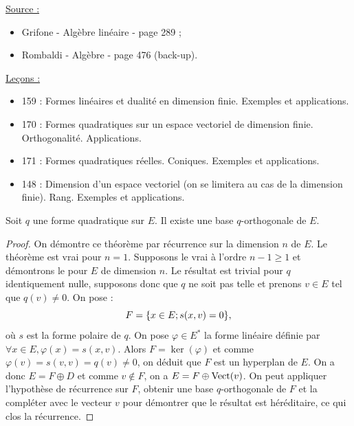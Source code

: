 
\newcommand{\Ee}{E^{\ast}}
\newcommand{\zero}{\set{0}}

\pagestyle{fancy}

\fancyhead[C]{}
\fancyhead[R]{}



\underline{Source :} 
\begin{itemize}
\item Grifone - Algèbre linéaire - page 289 ;
\item Rombaldi - Algèbre - page 476 (back-up).
\end{itemize}

\underline{Leçons :}
\begin{itemize}
\item  159 : Formes linéaires et dualité en dimension finie. Exemples et applications.
\item  170 : Formes quadratiques sur un espace vectoriel de dimension finie. Orthogonalité. Applications.
\item  171 : Formes quadratiques réelles. Coniques. Exemples et applications.
\item  148 : Dimension d’un espace vectoriel (on se limitera au cas de la dimension finie). Rang. Exemples et applications.
\end{itemize}

\begin{thm}
Soit $q$ une forme quadratique sur $E$. Il existe une base $q$-orthogonale de $E$.
\end{thm}

\begin{proof}
On démontre ce théorème par récurrence sur la dimension $n$ de $E$.
Le théorème est vrai pour $n=1$. Supposons le vrai à l'ordre $n-1 \geq 1$ et démontrons le pour $E$ de dimension $n$.
Le résultat est trivial pour $q$ identiquement nulle, supposons donc que $q$ ne soit pas telle et prenons $v \in E$ tel que $q(v) \neq 0$.
On pose :
\[ F = \{ x \in E ; s(x,v) = 0  \} , \]
où $s$ est la forme polaire de $q$. 
On pose $\varphi \in \Ee$ la forme linéaire définie par $\forall x \in E, \varphi(x) = s(x,v)$.
Alors $F = \ker(\varphi)$ et comme $\varphi(v) = s(v,v) = q(v) \neq 0$, on déduit que $F$ est un hyperplan de $E$.
On a donc $E = F \oplus D$ et comme $v \not \in F$, on a $E = F \oplus \operatorname{Vect}(v)$.
On peut appliquer l'hypothèse de récurrence sur $F$, obtenir une base $q$-orthogonale de $F$ et la compléter avec le vecteur $v$
pour démontrer que le résultat est héréditaire, ce qui clos la récurrence.
\end{proof}

